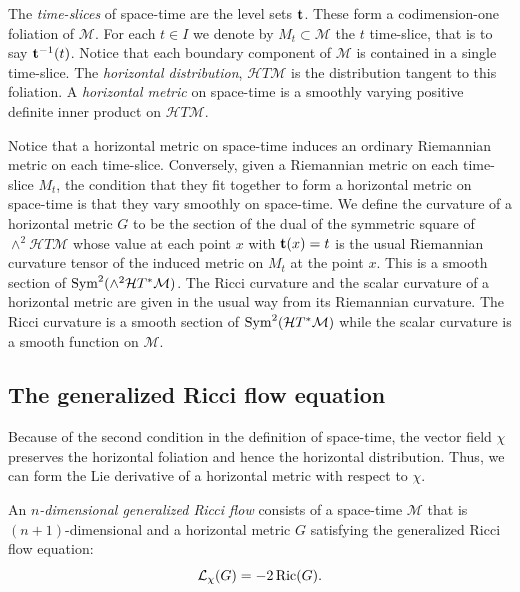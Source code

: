 \begin{definition}\label{def:time-slices-horizontal}



The {\em time-slices}
of space-time are the level sets ${\bf t}$. These form a
codimension-one foliation of ${\mathcal M}$. For each $t\in I$ we
denote by $M_t\subset {\mathcal M}$ the $t$ time-slice, that is to
say ${\bf t}^{-1}(t)$. Notice that each boundary component of
${\mathcal M}$ is contained in a single time-slice. The {\em
horizontal distribution}, ${\mathcal H}T{\mathcal M}$ is the
distribution tangent to this foliation. A {\em horizontal
metric} on
space-time is a smoothly varying positive definite inner product on
${\mathcal H}T{\mathcal M}$.
\end{definition}

Notice that a horizontal metric on space-time induces an ordinary
Riemannian metric on each time-slice. Conversely, given a Riemannian
metric on each time-slice $M_t$, the condition that they fit
together to form a horizontal metric on space-time is that they vary
smoothly on space-time. We define the curvature of a horizontal
metric $G$ to be the section of the dual of the symmetric square of
$\wedge^2{\mathcal H}T{\mathcal M}$ whose value at each point $x$ with ${\bf
t}(x)=t$ is the usual Riemannian curvature tensor of the induced
metric on $M_t$  at the point $x$. This is a smooth section of $\operatorname{Sym}^2(\wedge^2{\mathcal H}T^*{\mathcal M})$.
 The Ricci curvature and the scalar curvature of a horizontal metric
 are given in the usual way from its Riemannian curvature.
 The Ricci curvature is a smooth section of $\operatorname{Sym}^2({\mathcal
 H}T^*{\mathcal M})$ while the scalar curvature is a smooth function on ${\mathcal M}$.

\subsection{The generalized Ricci flow equation}



Because of the second condition in the definition of space-time, the
vector field $\chi$ preserves the horizontal foliation and hence the
horizontal distribution. Thus, we can form the Lie derivative of a
horizontal metric with respect to $\chi$.

\begin{definition}\label{def:generalized-ricci-flow}



An {\em $n$-dimensional generalized Ricci flow} consists of a space-time ${\mathcal M}$ that is
$(n+1)$-dimensional and a horizontal metric $G$ satisfying the
generalized Ricci flow equation:
$${\mathcal L}_\chi(G)=-2\operatorname{Ric}(G).$$
\end{definition}


